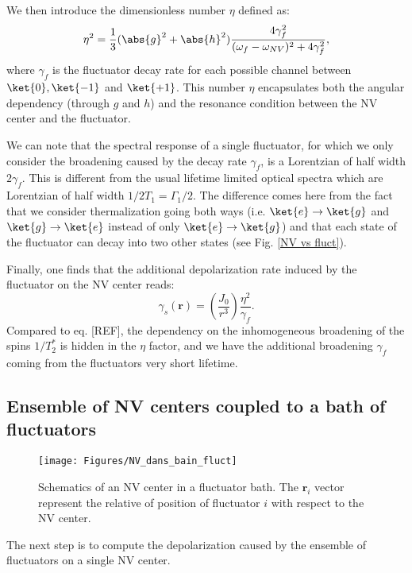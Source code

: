 \documentclass[a4paper,11pt]{report}
\begin{document}
We then introduce the dimensionless number $\eta$ defined as:
\begin{equation}
\label{eq eta}
\eta^2=\frac{1}{3} (\abs{g}^2+\abs{h}^2)  \frac{4\gamma_f^2}{(\omega_f - \omega_{NV})^2+4\gamma_f^2},
\end{equation}
where $\gamma_f$ is the fluctuator decay rate for each possible channel between $\ket{0}, \ket{-1}$ and $\ket{+1}$. This number $\eta$ encapsulates both the angular dependency (through $g$ and $h$) and the resonance condition between the NV center and the fluctuator.

We can note that the spectral response of a single fluctuator, for which we only consider the broadening caused by the decay rate $\gamma_f$, is a Lorentzian of half width $2\gamma_f$. This is different from the usual lifetime limited optical spectra which are Lorentzian of half width $1/2T_1=\Gamma_1/2$. The difference comes here from the fact that we consider thermalization going both ways (i.e. $\ket{e} \to \ket{g}$ and $\ket{g} \to \ket{e}$ instead of only $\ket{e} \to \ket{g}$) and that each state of the fluctuator can decay into two other states (see Fig. \ref{NV vs fluct}).

Finally, one finds that the additional depolarization rate induced by the fluctuator on the NV center reads:
\begin{equation}
\gamma_s(\mathbf{r})=\left(\frac{J_0}{r^3}\right) \frac{\eta^2}{\gamma_f}.
\end{equation}
Compared to eq. [REF], the dependency on the inhomogeneous broadening of the spins $1/T_2^*$ is hidden in the $\eta$ factor, and we have the additional broadening $\gamma_f$ coming from the fluctuators very short lifetime.

\subsection{Ensemble of NV centers coupled to a bath of fluctuators}

\begin{figure}[h]
\centering
\texttt{[image: Figures/NV\_dans\_bain\_fluct]}
\caption{Schematics of an NV center in a fluctuator bath. The $\mathbf{r}_i$ vector represent the relative of position of fluctuator $i$ with respect to the NV center.}
\label{NV + bain fluct}
\end{figure}

The next step is to compute the depolarization caused by the ensemble of fluctuators on a single NV center.
\end{document}
